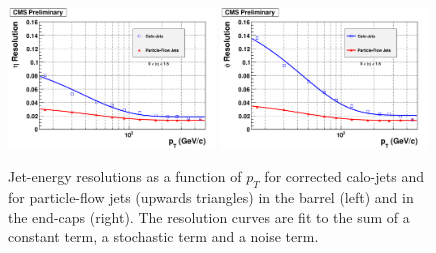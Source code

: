 \begin{figure}
\begin{center}
\includegraphics[width=0.49\textwidth]{Reconstruction/Figure_009-a-rotated90.pdf}
\includegraphics[width=0.49\textwidth]{Reconstruction/Figure_009-b-rotated90.pdf}
\caption{Jet-energy resolutions as a function of $p_T$ for corrected calo-jets and for particle-flow jets (upwards triangles) in the barrel (left) and in the end-caps (right). The resolution curves are fit to the sum of a constant term, a stochastic term and a noise term.~\cite{particleflow}}
\label{fig:jet_response_pt}
\end{center}
\end{figure}



